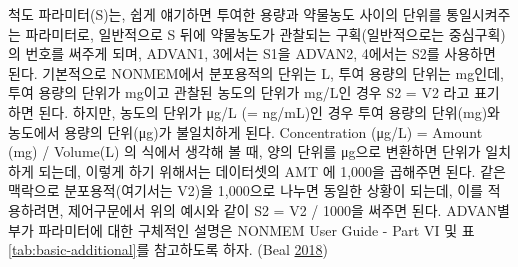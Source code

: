 \documentclass[
  11pt,
  krantz2, a4paper, twoside]{krantz}
\theoremstyle{definition}
\theoremstyle{definition}
\theoremstyle{definition}
\theoremstyle{remark}
\begin{document}
척도 파라미터(S)는, 쉽게 얘기하면 투여한 용량과 약물농도 사이의 단위를 통일시켜주는 파라미터로, 일반적으로 S 뒤에 약물농도가 관찰되는 구획(일반적으로는 중심구획)의 번호를 써주게 되며, ADVAN1, 3에서는 S1을 ADVAN2, 4에서는 S2를 사용하면 된다. 기본적으로 NONMEM에서 분포용적의 단위는 L, 투여 용량의 단위는 mg인데, 투여 용량의 단위가 mg이고 관찰된 농도의 단위가 mg/L인 경우 S2 = V2 라고 표기하면 된다. 하지만, 농도의 단위가 μg/L (= ng/mL)인 경우 투여 용량의 단위(mg)와 농도에서 용량의 단위(μg)가 불일치하게 된다. Concentration (μg/L) = Amount (mg) / Volume(L) 의 식에서 생각해 볼 때, 양의 단위를 μg으로 변환하면 단위가 일치하게 되는데, 이렇게 하기 위해서는 데이터셋의 AMT 에 1,000을 곱해주면 된다. 같은 맥락으로 분포용적(여기서는 V2)을 1,000으로 나누면 동일한 상황이 되는데, 이를 적용하려면, 제어구문에서 위의 예시와 같이 S2 = V2 / 1000을 써주면 된다. ADVAN별 부가 파라미터에 대한 구체적인 설명은 NONMEM User Guide - Part VI 및 표 \ref{tab:basic-additional}를 참고하도록 하자. (Beal \protect\hyperlink{ref-nonmem}{2018})

\footnotesize
\end{document}

